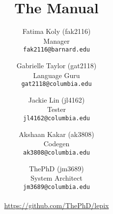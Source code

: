 \documentclass[11pt,letterpaper]{report}
\begin{document}
	\begin{titlepage}
		\title{The \lepix{} Manual}
		\author{
			Fatima Koly (fak2116)\\
			Manager\\
			\texttt{fak2116@barnard.edu}
			\and
			Gabrielle Taylor (gat2118)\\
			Language Guru\\
			\texttt{gat2118@columbia.edu}
			\and
			Jackie Lin (jl4162)\\
			Tester\\
			\texttt{jl4162@columbia.edu}
			\and
			Akshaan Kakar (ak3808)\\ 
			Codegen\\
			\texttt{ak3808@columbia.edu}
			\and
			ThePhD (jm3689)\\
			System Architect\\
			\texttt{jm3689@columbia.edu}
			\\\\
			\url{https://github.com/ThePhD/lepix}
		}
		\maketitle
		\thispagestyle{empty}
	\end{titlepage}
	\tableofcontents
	\pagebreak
	
	
	
	
	
\end{document}
